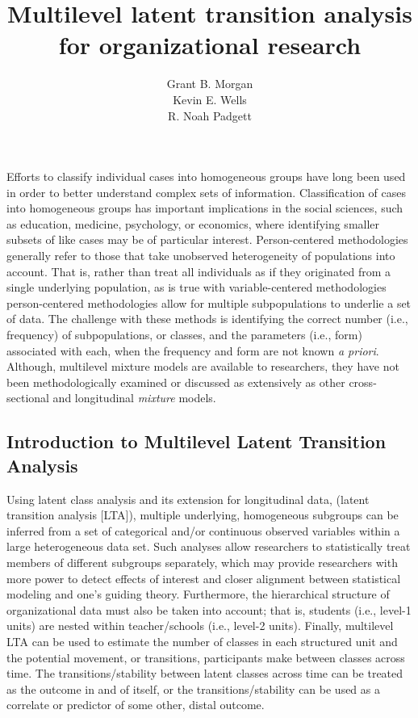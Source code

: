 \documentclass[man, noextraspace, floatsintext, 12pt]{apa7}
\title{Multilevel latent transition analysis for organizational research}
\author{Grant B. Morgan \\ Kevin E. Wells \\ R. Noah Padgett}
\affiliation{Baylor University}
\begin{document}
\maketitle

\setlength{\abovedisplayskip}{3pt}
\setlength{\belowdisplayskip}{3pt}


Efforts to classify individual cases into homogeneous groups have long been used in order to better understand complex sets of information. Classification of cases into homogeneous groups has important implications in the social sciences, such as education, medicine, psychology, or economics, where identifying smaller subsets of like cases may be of particular interest.  Person-centered methodologies generally refer to those that take unobserved heterogeneity of populations into account. That is, rather than treat all individuals as if they originated from a single underlying population, as is true with variable-centered methodologies  person-centered methodologies allow for multiple subpopulations to underlie a set of data. The challenge with these methods is identifying the correct number (i.e., frequency) of subpopulations, or classes, and the parameters (i.e., form) associated with each, when the frequency and form are not known \textit{a priori}. Although, multilevel mixture models are available to researchers, they have not been methodologically examined or discussed as extensively as other cross-sectional and longitudinal \textit{mixture} models. 

\subsection*{Introduction to Multilevel Latent Transition Analysis}
Using latent class analysis and its extension for longitudinal data, (latent transition analysis [LTA]), multiple underlying, homogeneous subgroups can be inferred from a set of categorical and/or continuous observed variables within a large heterogeneous data set. Such analyses allow researchers to statistically treat members of different subgroups separately, which may provide researchers with more power to detect effects of interest and closer alignment between statistical modeling and one's guiding theory. Furthermore, the hierarchical structure of organizational data must also be taken into account; that is, students (i.e., level-1 units) are nested within teacher/schools (i.e., level-2 units). Finally, multilevel LTA can be used to estimate the number of classes in each structured unit and the potential movement, or transitions, participants make between classes across time. The transitions/stability between latent classes across time can be treated as the outcome in and of itself, or the transitions/stability can be used as a correlate or predictor of some other, distal outcome.
\end{document}
